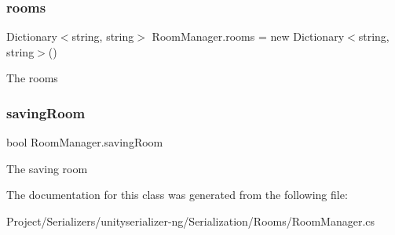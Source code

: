 \subsubsection{\texorpdfstring{rooms}{rooms}}
{\footnotesize\ttfamily Dictionary$<$string, string$>$ Room\+Manager.\+rooms = new Dictionary$<$string, string$>$()\hspace{0.3cm}{\ttfamily [static]}}



The rooms 

\mbox{\label{class_room_manager_aa1e3da11d5a2d3019e1d71da5d338614}} 
\subsubsection{\texorpdfstring{saving\+Room}{savingRoom}}
{\footnotesize\ttfamily bool Room\+Manager.\+saving\+Room\hspace{0.3cm}{\ttfamily [static]}}



The saving room 



The documentation for this class was generated from the following file\+:\begin{DoxyCompactItemize}
\item 
Project/\+Serializers/unityserializer-\/ng/\+Serialization/\+Rooms/Room\+Manager.\+cs\end{DoxyCompactItemize}
